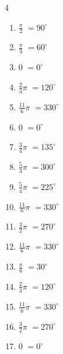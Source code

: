 \begin{multicols}{4}
\begin{enumerate}
\columnbreak %

  \item $\displaystyle \frac{\pi}{2}$
        $\displaystyle =90^{\circ}$

  \item $\displaystyle \frac{\pi}{3}$
        $\displaystyle =60^{\circ}$

  \item $\displaystyle 0$
        $\displaystyle =0^{\circ}$

  \item $\displaystyle \frac{2}{3}\pi$
        $\displaystyle =120^{\circ}$

  \item $\displaystyle \frac{11}{6}\pi$
        $\displaystyle =330^{\circ}$

  \item $\displaystyle 0$
        $\displaystyle =0^{\circ}$

  \item $\displaystyle \frac{3}{4}\pi$
        $\displaystyle =135^{\circ}$

  \item $\displaystyle \frac{5}{3}\pi$
        $\displaystyle =300^{\circ}$

  \item $\displaystyle \frac{5}{4}\pi$
        $\displaystyle =225^{\circ}$

  \item $\displaystyle \frac{11}{6}\pi$
        $\displaystyle =330^{\circ}$

  \item $\displaystyle \frac{3}{2}\pi$
        $\displaystyle =270^{\circ}$

  \item $\displaystyle \frac{11}{6}\pi$
        $\displaystyle =330^{\circ}$

  \item $\displaystyle \frac{\pi}{6}$
        $\displaystyle =30^{\circ}$

  \item $\displaystyle \frac{2}{3}\pi$
        $\displaystyle =120^{\circ}$

  \item $\displaystyle \frac{11}{6}\pi$
        $\displaystyle =330^{\circ}$

  \item $\displaystyle \frac{3}{2}\pi$
        $\displaystyle =270^{\circ}$

  \item $\displaystyle 0$
        $\displaystyle =0^{\circ}$


\end{enumerate}
\end{multicols}
